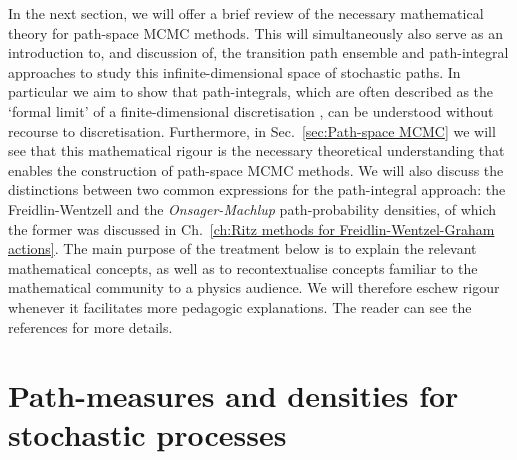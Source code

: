 In the next section, we will offer a brief review of the necessary mathematical theory for path-space MCMC methods. This will simultaneously also serve as an introduction to, and discussion of, the transition path ensemble and path-integral approaches to study this infinite-dimensional space of stochastic paths. In particular we aim to show that path-integrals, which are often described as the `formal limit' of a finite-dimensional discretisation \citep{mossNoiseNonlinearDynamical1989, stratonovichMarkovMethodsTheory1989a, moretteDefinitionApproximationFeynman1951}, can be understood without recourse to discretisation. Furthermore, in Sec.~\ref{sec:Path-space MCMC} we will see that this mathematical rigour is the necessary theoretical understanding that enables the construction of path-space MCMC methods. We will also discuss the distinctions between two common expressions for the path-integral approach: the Freidlin-Wentzell and the \textit{Onsager-Machlup} path-probability densities, of which the former was discussed in Ch.~\ref{ch:Ritz methods for Freidlin-Wentzel-Graham actions}. The main purpose of the treatment below is to explain the relevant mathematical concepts, as well as to recontextualise concepts familiar to the mathematical community to a physics audience. We will therefore eschew rigour whenever it facilitates more pedagogic explanations. The reader can see the references for more details.

\section{Path-measures and densities for stochastic processes} 

